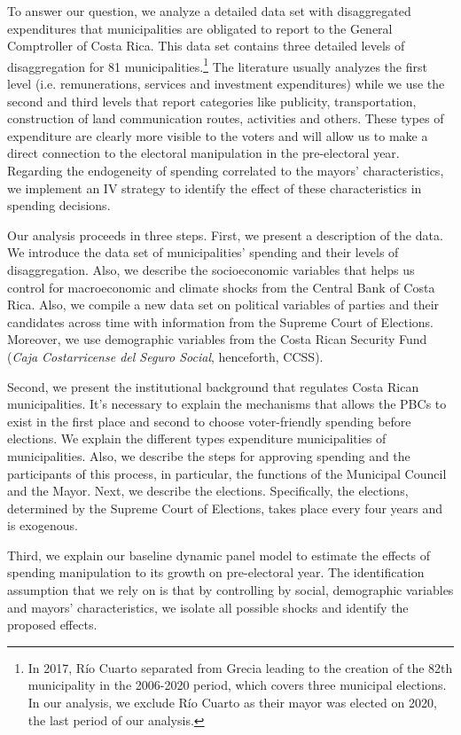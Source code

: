 To answer our question, we analyze a detailed data set with disaggregated expenditures that municipalities are obligated to report to the General Comptroller of Costa Rica. This data set contains three detailed levels of disaggregation for 81 municipalities.\footnote{In 2017, Río Cuarto separated from Grecia leading to the creation of the 82th municipality in the 2006-2020 period, which covers three municipal elections. In our analysis, we exclude Río Cuarto as their mayor was elected on 2020, the last period of our analysis. }  The literature usually analyzes the first level (i.e. remunerations, services and investment expenditures) while we use the second and third levels that report categories like publicity, transportation, construction of land communication routes, activities and others. These types of expenditure are clearly more visible to the voters and will allow us to make a direct connection to the electoral manipulation in the pre-electoral year. Regarding the endogeneity of spending correlated to the mayors' characteristics, we implement an IV strategy to identify the effect of these characteristics in spending decisions. 

Our analysis proceeds in three steps. First, we present a description of the data. We introduce the data set of municipalities' spending and their levels of disaggregation. Also, we describe the socioeconomic variables that helps us control for macroeconomic and climate shocks from the Central Bank of Costa Rica. Also, we compile a new data set on political variables of parties and their candidates across time with information from the Supreme Court of Elections. Moreover, we use demographic variables from the Costa Rican Security Fund (\textit{Caja Costarricense del Seguro Social}, henceforth, CCSS). 

Second, we present the institutional background that regulates Costa Rican municipalities. It's necessary to explain the mechanisms that allows the PBCs to exist in the first place and second to choose voter-friendly spending before elections. We explain the different types expenditure municipalities of municipalities. Also, we describe the steps for approving spending and the participants of this process, in particular, the functions of the Municipal Council and the Mayor. Next, we describe the elections. Specifically, the elections, determined by the Supreme Court of Elections, takes place every four years and is exogenous.

Third, we explain our baseline dynamic panel model to estimate the effects of spending manipulation to its growth on pre-electoral year. The identification assumption that we rely on is that by controlling by social, demographic variables and mayors' characteristics, we isolate all possible shocks and identify the proposed effects. 
